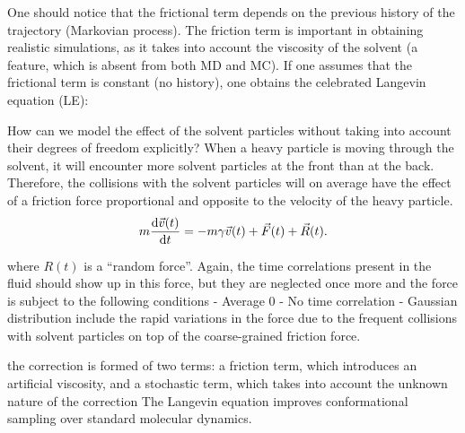 \documentclass[../../main-notes.tex]{subfiles}
\begin{document}
One should notice that the frictional term depends on the previous history of the trajectory (Markovian process). 
The friction term is important in obtaining realistic simulations, as it takes into account the viscosity of the solvent (a feature, which is absent from both MD and MC). 
If one assumes that the frictional term is constant (no history), one obtains the celebrated Langevin equation (LE):\citep{paquetMolecularDynamicsMonte2015}



How can we model the effect of the solvent particles without taking into account their degrees of freedom explicitly? 
When a heavy particle is moving through the solvent, it will encounter more solvent particles at the front than at the back. 
Therefore, the collisions with the solvent particles will on average have the effect of a friction force proportional and opposite to the velocity of the heavy particle.\citep{Thijssen2007}
\begin{gather}
    m\dv{\vec{v}(t)}{t}=-m\gamma \vec{v}(t)+\vec{F}(t)+\vec{R}(t).\label{eqn:BrownianDyn1}
\end{gather}

where $R(t)$ is a ``random force''.
Again, the time correlations present in the fluid should show up in this force, but they are neglected once more and the force is subject to the following conditions 
- Average $0$
- No time correlation
- Gaussian distribution
include the rapid variations in the force due to the frequent collisions with solvent particles on top of the coarse-grained friction force.

the correction is formed of two terms: a friction term, which introduces an artificial viscosity, and a stochastic term, which takes into account the unknown nature of the correction\citep{paquetMolecularDynamicsMonte2015}
The Langevin equation improves conformational sampling over standard molecular dynamics\citep{paquetMolecularDynamicsMonte2015}.
\end{document}
